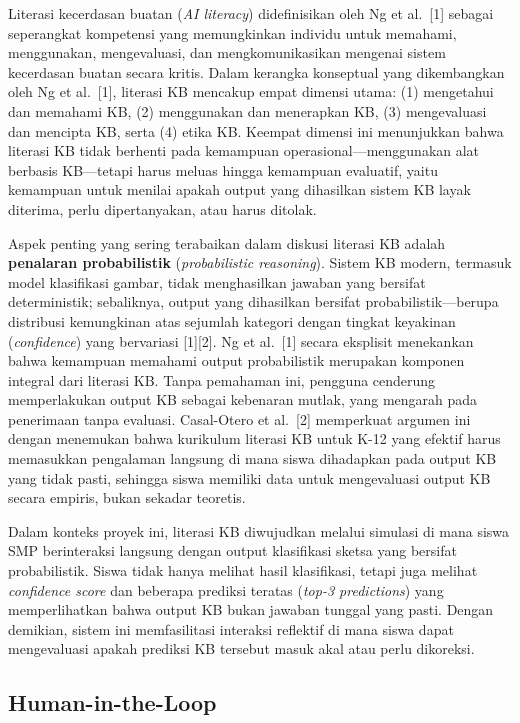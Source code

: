 \documentclass[12pt,oneside]{report}
\begin{document}
Literasi kecerdasan buatan (\textit{AI literacy}) didefinisikan oleh Ng et al.\ [1] sebagai seperangkat kompetensi yang memungkinkan individu untuk memahami, menggunakan, mengevaluasi, dan mengkomunikasikan mengenai sistem kecerdasan buatan secara kritis. Dalam kerangka konseptual yang dikembangkan oleh Ng et al.\ [1], literasi KB mencakup empat dimensi utama: (1) mengetahui dan memahami KB, (2) menggunakan dan menerapkan KB, (3) mengevaluasi dan mencipta KB, serta (4) etika KB. Keempat dimensi ini menunjukkan bahwa literasi KB tidak berhenti pada kemampuan operasional---menggunakan alat berbasis KB---tetapi harus meluas hingga kemampuan evaluatif, yaitu kemampuan untuk menilai apakah output yang dihasilkan sistem KB layak diterima, perlu dipertanyakan, atau harus ditolak.

Aspek penting yang sering terabaikan dalam diskusi literasi KB adalah \textbf{penalaran probabilistik} (\textit{probabilistic reasoning}). Sistem KB modern, termasuk model klasifikasi gambar, tidak menghasilkan jawaban yang bersifat deterministik; sebaliknya, output yang dihasilkan bersifat probabilistik---berupa distribusi kemungkinan atas sejumlah kategori dengan tingkat keyakinan (\textit{confidence}) yang bervariasi [1][2]. Ng et al.\ [1] secara eksplisit menekankan bahwa kemampuan memahami output probabilistik merupakan komponen integral dari literasi KB. Tanpa pemahaman ini, pengguna cenderung memperlakukan output KB sebagai kebenaran mutlak, yang mengarah pada penerimaan tanpa evaluasi. Casal-Otero et al.\ [2] memperkuat argumen ini dengan menemukan bahwa kurikulum literasi KB untuk K-12 yang efektif harus memasukkan pengalaman langsung di mana siswa dihadapkan pada output KB yang tidak pasti, sehingga siswa memiliki data untuk mengevaluasi output KB secara empiris, bukan sekadar teoretis.

Dalam konteks proyek ini, literasi KB diwujudkan melalui simulasi di mana siswa SMP berinteraksi langsung dengan output klasifikasi sketsa yang bersifat probabilistik. Siswa tidak hanya melihat hasil klasifikasi, tetapi juga melihat \textit{confidence score} dan beberapa prediksi teratas (\textit{top-3 predictions}) yang memperlihatkan bahwa output KB bukan jawaban tunggal yang pasti. Dengan demikian, sistem ini memfasilitasi interaksi reflektif di mana siswa dapat mengevaluasi apakah prediksi KB tersebut masuk akal atau perlu dikoreksi.

\subsection{Human-in-the-Loop}
\label{subsec:hitl}
\end{document}
